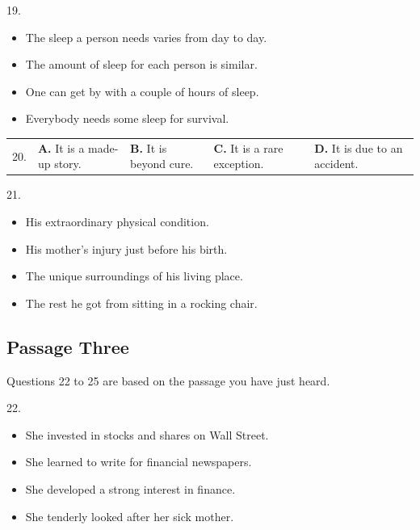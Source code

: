 \documentclass[UTF8,11pt]{ctexart}
\begin{document}
19.


\begin{itemize}[leftmargin=2em,itemsep=.2em,topsep=.4em]\item[A.] The sleep a person needs varies from day to day.
\item[B.] The amount of sleep for each person is similar.
\item[C.] One can get by with a couple of hours of sleep.
\item[D.] Everybody needs some sleep for survival.
\end{itemize}

\noindent\begin{tabularx}{\linewidth}{@{}lXXXX@{}}20. & \textbf{A.} It is a made-up story. & \textbf{B.} It is beyond cure. & \textbf{C.} It is a rare exception. & \textbf{D.} It is due to an accident.\\\end{tabularx}\par

21.


\begin{itemize}[leftmargin=2em,itemsep=.2em,topsep=.4em]\item[A.] His extraordinary physical condition.
\item[B.] His mother’s injury just before his birth.
\item[C.] The unique surroundings of his living place.
\item[D.] The rest he got from sitting in a rocking chair.
\end{itemize}

\subsection*{Passage Three}


Questions 22 to 25 are based on the passage you have just heard.


22.


\begin{itemize}[leftmargin=2em,itemsep=.2em,topsep=.4em]\item[A.] She invested in stocks and shares on Wall Street.
\item[B.] She learned to write for financial newspapers.
\item[C.] She developed a strong interest in finance.
\item[D.] She tenderly looked after her sick mother.
\end{itemize}
\end{document}
